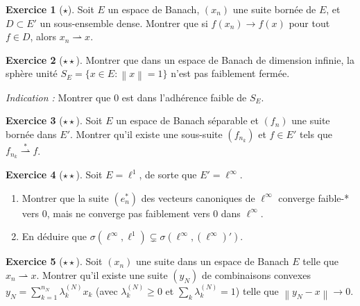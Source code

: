 \documentclass[a4paper,12pt]{book}
\newcommand{\norm}[1]{\left\| #1 \right\|}
\newcommand{\weakto}{\rightharpoonup}
\newcommand{\weakstarto}{\overset{*}{\rightharpoonup}}
\theoremstyle{definition}
\newtheorem{exercice}{Exercice}[chapter]
\theoremstyle{plain}
\theoremstyle{remark}
\begin{document}
\begin{exercice}[$\star$]
\label{exo:faible-suite-bornee}
Soit $E$ un espace de Banach, $(x_n)$ une suite bornée de $E$, et $D \subset E'$
un sous-ensemble dense. Montrer que si $f(x_n) \to f(x)$ pour tout $f \in D$,
alors $x_n \weakto x$.
\end{exercice}

\begin{exercice}[$\star\star$]
\label{exo:faible-fermee}
Montrer que dans un espace de Banach de dimension infinie, la sphère unité
$S_E = \{x \in E : \norm{x} = 1\}$ n'est pas faiblement fermée.

\textit{Indication :} Montrer que $0$ est dans l'adhérence faible de $S_E$.
\end{exercice}

\begin{exercice}[$\star\star$]
\label{exo:alaoglu-application}
Soit $E$ un espace de Banach séparable et $(f_n)$ une suite bornée dans $E'$.
Montrer qu'il existe une sous-suite $(f_{n_k})$ et $f \in E'$ tels que
$f_{n_k} \weakstarto f$.
\end{exercice}

\begin{exercice}[$\star\star$]
\label{exo:faible-etoile-pas-faible}
Soit $E = \ell^1$, de sorte que $E' = \ell^\infty$.
\begin{enumerate}[label=(\alph*)]
  \item Montrer que la suite $(e_n^*)$ des vecteurs canoniques de $\ell^\infty$ converge
    faible-* vers $0$, mais ne converge pas faiblement vers $0$ dans $\ell^\infty$.
  \item En déduire que $\sigma(\ell^\infty, \ell^1) \subsetneq \sigma(\ell^\infty, (\ell^\infty)')$.
\end{enumerate}
\end{exercice}

\begin{exercice}[$\star\star$]
\label{exo:mazur-application}
Soit $(x_n)$ une suite dans un espace de Banach $E$ telle que $x_n \weakto x$.
Montrer qu'il existe une suite $(y_N)$ de combinaisons convexes
$y_N = \sum_{k=1}^{n_N} \lambda_k^{(N)} x_k$ (avec $\lambda_k^{(N)} \ge 0$ et
$\sum_k \lambda_k^{(N)} = 1$) telle que $\norm{y_N - x} \to 0$.
\end{exercice}
\end{document}
